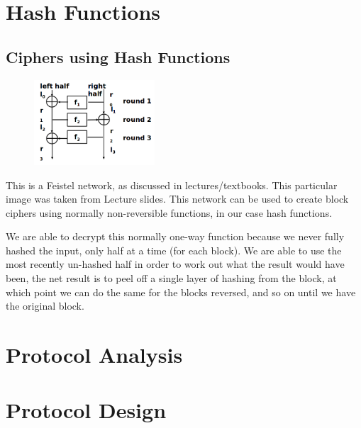 \documentclass{article}
\begin{document}
\section{Hash Functions}

\subsection{Ciphers using Hash Functions}

\begin{figure}[htb]
\begin{center}
\leavevmode
\includegraphics[width=0.4\textwidth]{feistel.png}
\end{center}
\label{fig:vortrap}
\end{figure}

This is a Feistel network, as discussed in lectures/textbooks.
This particular image was taken from Lecture slides.
This network can be used to create block ciphers using normally non-reversible functions, in our case hash functions.

We are able to decrypt this normally one-way function because we never fully hashed the input, only half at a time (for each block).
We are able to use the most recently un-hashed half in order to work out what the result would have been, the net result is to peel off a single layer of hashing from the block, at which point we can do the same for the blocks reversed, and so on until we have the original block.

\section{Protocol Analysis}


\section{Protocol Design}
\end{document}
